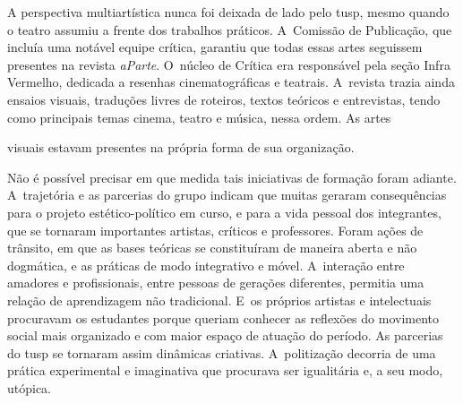 A perspectiva multiartística nunca foi deixada de lado pelo {\sc tusp}, mesmo
quando o teatro assumiu a frente dos trabalhos práticos. A~Comissão de
Publicação, que incluía uma notável equipe crítica, garantiu que todas
essas artes seguissem presentes na revista {\it aParte}. O~núcleo de
Crítica era responsável pela seção Infra Vermelho, dedicada a
resenhas cinematográficas e teatrais. A~revista trazia ainda ensaios
visuais, traduções livres de roteiros, textos teóricos e entrevistas,
tendo como principais temas cinema, teatro e música, nessa ordem. As
artes

\column

\noindent{}visuais estavam presentes na própria forma de sua organização.

Não é possível precisar em que medida tais iniciativas de formação
foram adiante. A~trajetória e as parcerias do grupo indicam que muitas
geraram consequências para o projeto estético-político em curso, e para
a vida pessoal dos integrantes, que se tornaram importantes artistas,
críticos e professores. Foram ações de trânsito, em que as bases
teóricas se constituíram de maneira aberta e não dogmática, e as
práticas de modo integrativo e móvel. A~interação entre amadores e
profissionais, entre pessoas de gerações diferentes, permitia uma
relação de aprendizagem não tradicional. E~os próprios artistas e
intelectuais procuravam os estudantes porque queriam conhecer as
reflexões do movimento social mais organizado e com maior espaço de
atuação do período. As parcerias do {\sc tusp} se tornaram assim dinâmicas
criativas. A~politização decorria de uma prática experimental e
imaginativa que procurava ser igualitária e, a seu modo, utópica.

\page

{}{}
{}{}
{}{}
\stopcombination

\page

\subject{Base de ensaios e parcerias institucionais}


